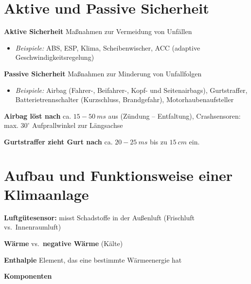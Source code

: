 \section{Aktive und Passive
Sicherheit}\label{aktive-und-passive-sicherheit}

\textbf{Aktive Sicherheit} Maßnahmen zur Vermeidung von Unfällen

\begin{itemize}
\item
  \emph{Beispiele:} ABS, ESP, Klima, Scheibenwischer, ACC (adaptive
  Geschwindigkeitsregelung)
\end{itemize}

\textbf{Passive Sicherheit} Maßnahmen zur Minderung von Unfallfolgen

\begin{itemize}
\item
  \emph{Beispiele:} Airbag (Fahrer-, Beifahrer-, Kopf- und
  Seitenairbags), Gurtstraffer, Batterietrennschalter (Kurzschluss,
  Brandgefahr), Motorhaubenaufsteller
\end{itemize}

\textbf{Airbag löst nach} ca. $15 - 50~ms$ aus (Zündung --
Entfaltung), Crashsensoren: max. $30^\circ$ Aufprallwinkel zur
Längsachse

\textbf{Gurtstraffer zieht Gurt nach} ca. $20 - 25~ms$ bis zu
$15~cm$ ein.

\section{Aufbau und Funktionsweise einer
Klimaanlage}\label{aufbau-und-funktionsweise-einer-klimaanlage}

\textbf{Luftgütesensor:} misst Schadstoffe in der Außenluft (Frischluft
vs.~Innenraumluft)

\textbf{Wärme} vs.~\textbf{negative Wärme} (Kälte)

\textbf{Enthalpie} Element, das eine bestimmte Wärmeenergie hat

\textbf{Komponenten}

